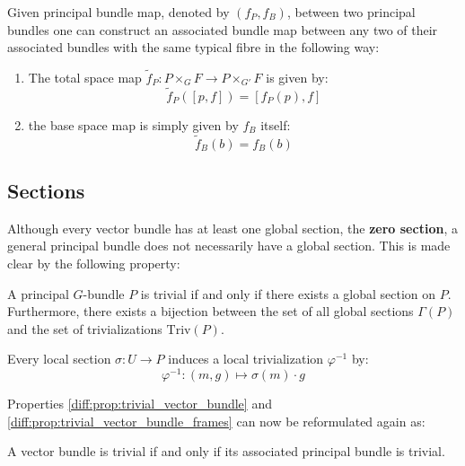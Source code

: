 	\begin{construct}
		Given principal bundle map, denoted by $(f_P, f_B)$, between two principal bundles one can construct an associated bundle map between any two of their associated bundles with the same typical fibre in the following way:
		\begin{enumerate}
			\item The total space map $\widetilde{f}_P:P\times_G F\rightarrow P\times_{G'} F$ is given by:
			\begin{equation}
				\widetilde{f}_P([p, f]) = [f_P(p), f]
			\end{equation}
			\item the base space map is simply given by $f_B$ itself:
			\begin{equation}
				\widetilde{f}_B(b) = f_B(b)
			\end{equation}
		\end{enumerate}
	\end{construct}

\subsection{Sections}

	Although every vector bundle has at least one global section, the \textbf{zero section}\footnotemark, a general principal bundle does not necessarily have a global section. This is made clear by the following property:
	\begin{property}
		A principal $G$-bundle $P$ is trivial if and only if there exists a global section on $P$. Furthermore, there exists a bijection between the set of all global sections $\Gamma(P)$ and the set of trivializations $\text{Triv}(P)$.
	\end{property}
	
	\begin{result}\label{diff:prin_section_triv}
		Every local section $\sigma:U\rightarrow P$ induces a local trivialization $\varphi^{-1}$ by:
		\begin{equation}
			\varphi^{-1}:(m, g)\mapsto \sigma(m)\cdot g
		\end{equation}
	\end{result}
	
	Properties \ref{diff:prop:trivial_vector_bundle} and \ref{diff:prop:trivial_vector_bundle_frames} can now be reformulated again as:
	\begin{theorem}
		A vector bundle is trivial if and only if its associated principal bundle is trivial.
	\end{theorem}

